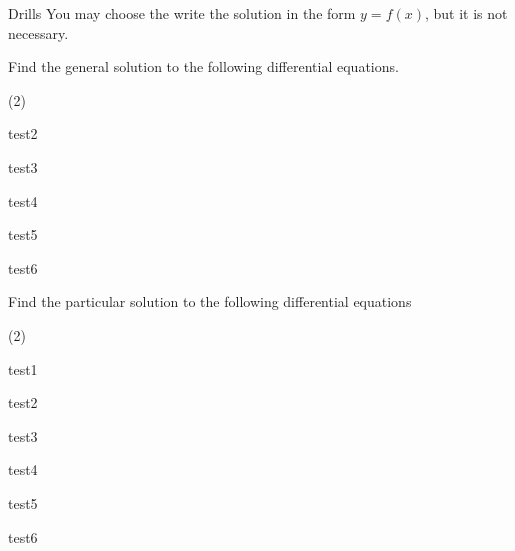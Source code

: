 \begin{questions}{Drills}
You may choose the write the solution in the form $y=f(x)$, but it is not necessary.

Find the general solution to the following differential equations.
\begin{question_set}(2)
\item 
\item test2
\item test3
\item test4
\item test5
\item test6
\end{question_set}

Find the particular solution to the following differential equations
\begin{question_set}(2)
\item test1
\item test2
\item test3
\item test4
\item test5
\item test6
\end{question_set}
\end{questions}




